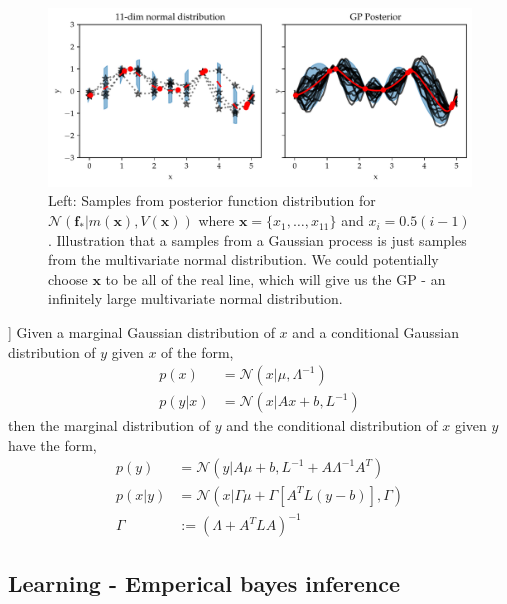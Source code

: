 \begin{figure}[h]
    \centering
    \includegraphics[width = \textwidth]{Pictures/GP2_samples_mattern.pdf}
    \caption{Left: Samples from posterior function distribution for
    $\mathcal{N}(\textbf{f}_*|m(\textbf{x}),V(\textbf{x}))$ where $\textbf{x} = \{x_1,\dots, x_{11}\}$
    and $x_i= 0.5(i-1)$. Illustration that a samples from a Gaussian process is just samples from
    the multivariate normal distribution. We could potentially choose $\textbf{x}$ to be all of the
    real line, which will give us the GP - an infinitely large multivariate normal distribution.}
    \label{GP_illustration2}
\end{figure}



\begin{testexample2}[Trick with normal distributions [from Bishops book?]]
    Given a marginal Gaussian distribution of $x$ and a conditional Gaussian distribution
    of $y$ given $x$ of the form, 
    \begin{align*}
        p(x) &= \mathcal{N}(x|\mu, \Lambda^{-1})\\
        p(y|x) &= \mathcal{N}(x|Ax+b, L^{-1})
    \end{align*}
    then the marginal distribution of $y$ and the conditional distribution of $x$ given $y$
    have the form, 
    \begin{align}
        p(y) &= \mathcal{N}(y|A\mu+b,L^{-1}+A \Lambda^{-1}A^T) \label{marginal_distribution}\\
        p(x|y) &= \mathcal{N}(x|\Gamma \mu+\Gamma [A^TL(y-b)],\Gamma )\\
        \Gamma &:= (\Lambda +A^TLA)^{-1}
    \end{align}
\end{testexample2}




\subsection{Learning - Emperical bayes inference}

